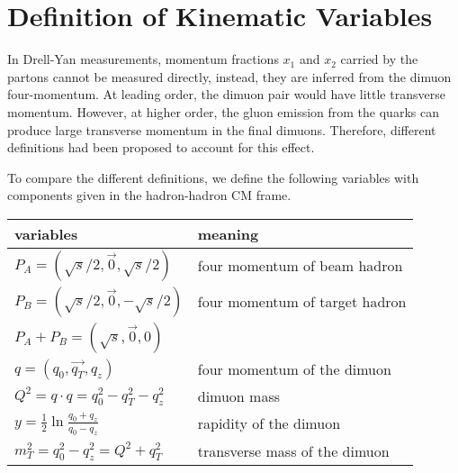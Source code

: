 \documentclass[../main.tex]{subfiles}
\begin{document}
\chapter{Definition of Kinematic Variables}
\label{a_ch:kinematic}
In Drell-Yan measurements, momentum fractions $x_1$ and $x_2$ carried by the partons
cannot be measured directly, instead, they are inferred from the
dimuon four-momentum. At leading order, the dimuon pair would have little
transverse momentum. However, at higher order, the gluon emission from the quarks
can produce large transverse momentum in the final dimuons. Therefore, different
definitions had been proposed to account for this effect.

To compare the different definitions, we define the following variables with
components given in the hadron-hadron CM frame.
\begin{table}[h!]
	\centering
	\begin{tabular}{l|l}
		variables                                                 & meaning                        \\ \hline
		$P_A = \left(   \sqrt{s}/2, \vec{0}, \sqrt{s}/2 \right)$  & four momentum of beam hadron   \\
		$P_B = \left( \sqrt{s}/2, \vec{0},   -\sqrt{s}/2 \right)$ & four momentum of target hadron \\
		$P_A+P_B=\left(\sqrt{s},\vec{0},0\right)$                 &                                \\
		$q = \left(q_0, \vec{q_T}, q_z\right)$                    & four momentum of the dimuon    \\
		$Q^2=q\cdot q=q_0^2-q_T^2-q_z^2$                          & dimuon mass                    \\
		$y=\frac{1}{2}\ln \frac{q_0 +   q_z}{q_0-q_z}$            & rapidity of the dimuon         \\
		$m_T^2 = q_0^2 - q_z^2=Q^2+q_T^2$                         & transverse mass of the dimuon  \\ \hline
	\end{tabular}
\end{table}
\end{document}
